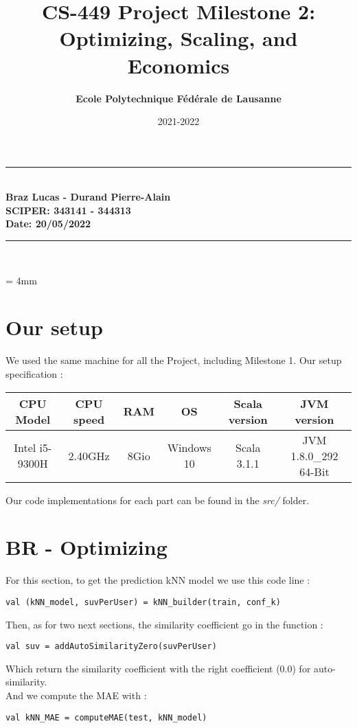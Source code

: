 \documentclass{article}
\title{CS-449 Project Milestone 2: Optimizing, Scaling, and Economics}
\author{\textbf{Ecole Polytechnique Fédérale de Lausanne }\\[3mm]}
\date{2021-2022}
\newcommand{\HRule}{\rule{\linewidth}{0.5mm}}
\begin{document}
\maketitle
\noindent

\HRule\\[3mm]
{\large \bf Braz Lucas - Durand Pierre-Alain}\\[3mm]
{\large \bf SCIPER: 343141 - 344313}\\[3mm]
{\large \bf Date: 20/05/2022}\\[2mm]
\HRule\\
\vspace*{5mm}

\baselineskip = 4mm

\tableofcontents

\newpage
\justify

\section{Our setup}
We used the same machine for all the Project, including Milestone 1. Our setup specification :
\FloatBarrier
\begin{table}[ht]
\centering
\begin{tabular}{|c|c|c|c|c|c|}
\textbf{CPU Model} & \textbf{CPU speed} & \textbf{RAM} & \textbf{OS}  & \textbf{Scala version} & \textbf{JVM version} \\
\hline
Intel i5-9300H & 2.40GHz & 8Gio & Windows 10  & Scala 3.1.1 & JVM 1.8.0\_292 64-Bit\\
\end{tabular}
\label{tbl:results}
\end{table}
\FloatBarrier
Our code implementations for each part can be found in the \textit{src/} folder.

\section{BR - Optimizing}
For this section, to get the prediction kNN model we use this code line :
\begin{lstlisting}[style=scala]
val (kNN_model, suvPerUser) = kNN_builder(train, conf_k)
\end{lstlisting}
Then, as for two next sections, the similarity coefficient go in the function :
\begin{lstlisting}[style=scala]
val suv = addAutoSimilarityZero(suvPerUser)
\end{lstlisting}
Which return the similarity coefficient with the right coefficient ($0.0$) for auto-similarity.\\
And we compute the MAE with :
\begin{lstlisting}[style=scala]
val kNN_MAE = computeMAE(test, kNN_model)
\end{lstlisting}
\end{document}
